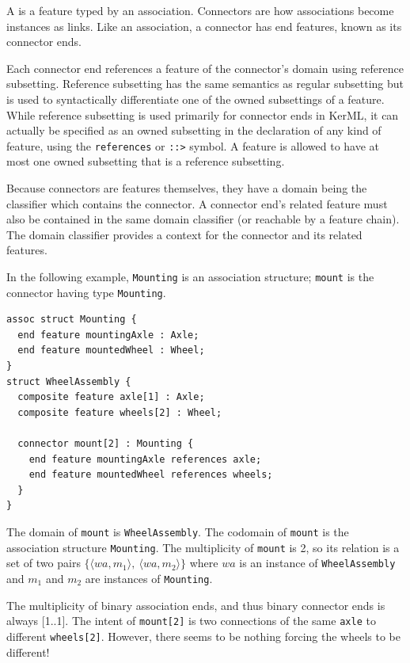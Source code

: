 


\pn A  is a feature typed by an {association}.  Connectors are how associations become instances as links.
Like an association, a connector has end features, known as its connector ends.  

\pn Each connector end references a feature of the connector's domain using reference subsetting. 
Reference subsetting has the same semantics as regular subsetting 
but is used to syntactically differentiate one of the owned subsettings of a feature. While reference subsetting is used
primarily for connector ends in KerML, it can actually be specified as an owned subsetting in the declaration of any
kind of feature, using the \texttt{references} or \texttt{::>} symbol. A feature is allowed to have at most one owned subsetting
that is a reference subsetting.

\pn Because connectors are features themselves, they have a domain being the classifier which contains the connector.  A connector end's related feature must also be contained in the same domain classifier (or reachable by a feature chain).  The domain classifier provides a context for the connector and its related features.

\pn In the following example, \texttt{Mounting} is an association structure; \texttt{mount} is the connector having type \texttt{Mounting}.

\begin{lstlisting}
assoc struct Mounting {
  end feature mountingAxle : Axle;
  end feature mountedWheel : Wheel;
}
struct WheelAssembly {
  composite feature axle[1] : Axle;
  composite feature wheels[2] : Wheel;

  connector mount[2] : Mounting {
    end feature mountingAxle references axle;
    end feature mountedWheel references wheels;
  }
}
\end{lstlisting}

\pn The domain of \texttt{mount} is \texttt{WheelAssembly}.  The codomain of \texttt{mount} is the association structure \texttt{Mounting}.
The multiplicity of \texttt{mount} is 2, so its relation is a set of two pairs $\{\langle wa,m_1\rangle,~\langle wa,m_2\rangle\}$ where $wa$ is an instance of \texttt{WheelAssembly} and $m_1$ and $m_2$ are instances of \texttt{Mounting}.

The multiplicity of binary association ends, and thus binary connector ends is always [1..1].  The intent of \texttt{mount[2]} is two connections of the same \texttt{axle} to different \texttt{wheels[2]}.
However, there seems to be nothing forcing the wheels to be different!

